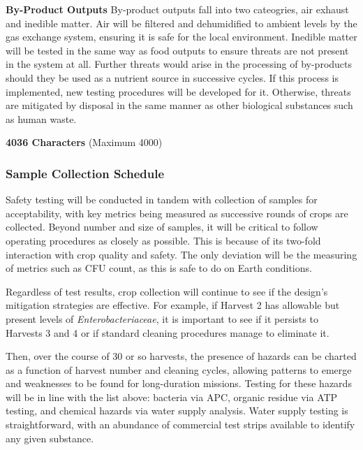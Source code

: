 \textbf{By-Product Outputs}
By-product outputs fall into two cateogries, air exhaust and inedible matter. Air will be filtered and dehumidified to ambient levels by the gas exchange system, ensuring it is safe for the local environment. Inedible matter will be tested in the same way as food outputs to ensure threats are not present in the system at all. Further threats would arise in the processing of by-products should they be used as a nutrient source in successive cycles. If this process is implemented, new testing procedures will be developed for it. Otherwise, threats are mitigated by disposal in the same manner as other biological substances such as human waste.


\textbf{4036 Characters} (Maximum 4000)

\subsubsection{Sample Collection Schedule}
Safety testing will be conducted in tandem with collection of samples for acceptability, with key metrics being measured as successive rounds of crops are collected. Beyond number and size of samples, it will be critical to follow operating procedures as closely as possible. This is because of its two-fold interaction with crop quality and safety. The only deviation will be the measuring of metrics such as CFU count, as this is safe to do on Earth conditions.

Regardless of test results, crop collection will continue to see if the design's mitigation strategies are effective. For example, if Harvest 2 has allowable but present levels of \textit{Enterobacteriaceae}, it is important to see if it persists to Harvests 3 and 4 or if standard cleaning procedures manage to eliminate it.

Then, over the course of 30 or so harvests, the presence of hazards can be charted as a function of harvest number and cleaning cycles, allowing patterns to emerge and weaknesses to be found for long-duration missions. Testing for these hazards will be in line with the list above: bacteria via APC, organic residue via ATP testing, and chemical hazards via water supply analysis. Water supply testing is straightforward, with an abundance of commercial test strips available to identify any given substance.



